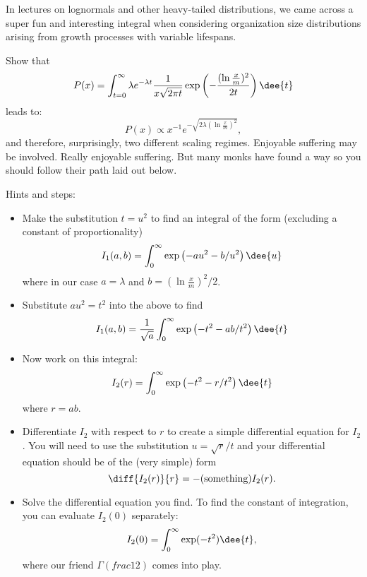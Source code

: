 \begin{enumerate}
       In lectures on lognormals and other heavy-tailed distributions,
       we came across a super fun and interesting integral when considering 
       organization size distributions
       arising from growth processes with variable lifespans.

       Show that 
       $$
       P(x) = \int_{t=0}^\infty
       \lambda e^{-\lambda t}
       \frac{1}{x \sqrt{2\pi t}}
       \exp
       \left(
       -\frac{(\ln \frac{x}{m})^{2}}
       {2t}
       \right)
       \dee{t}
       $$
       leads to:
       $$
       P(x)
       \propto
       x^{-1} e^{- \sqrt{2 \lambda (\ln \frac{x}{m}) ^{2}}},
       $$
       and therefore, surprisingly, two different scaling regimes.
       Enjoyable suffering may be involved.
       Really enjoyable suffering.
       But many monks have found a way so you should
       follow their path laid out below.

       Hints and steps:
       \begin{itemize}
       \item 
         Make the substitution $t = u^{2}$ to
         find an integral of the form
         (excluding a constant of proportionality)
         $$
         I_{1}(a,b) = \int_{0}^{\infty} \exp \left( -au^{2} - b/u^{2} \right) \dee{u}
         $$
         where in our case
         $a = \lambda$ and $b=(\ln \frac{x}{m})^{2}/2$.
       \item
         Substitute $au^{2} = t^{2}$ into the above to find
         $$
         I_{1}(a,b)
         =
         \frac{1}{\sqrt{a}}
         \int_{0}^{\infty} 
         \exp \left( -t^{2} - ab/t^{2} \right) \dee{t}
         $$
       \item
         Now work on this integral:
         $$
         I_{2}(r)
         =
         \int_{0}^{\infty} 
         \exp \left( -t^{2} - r/t^{2} \right) \dee{t}
         $$
         where $r = ab$.
       \item
         Differentiate $I_{2}$ with respect to $r$
         to create a simple differential equation for $I_{2}$.
         You will need to use the substitution $u=\sqrt{r}/t$
         and your differential equation should be of the (very simple) form
         $$
         \diff{I_{2}(r)}{r} = -(\mbox{something}) I_{2}(r).
         $$
       \item
         Solve the differential equation you find.
         To find the constant of integration,
         you can evaluate $I_{2}(0)$ separately:
         $$
         I_{2}(0)
         =
         \int_{0}^{\infty} 
         \exp (-t^{2}) \dee{t},
         $$
         where our friend 
         $\Gamma(frac{1}{2})$ 
         comes into play.
       \end{itemize}

       
   \solutionstart


   \solutionend




       
\end{enumerate}

